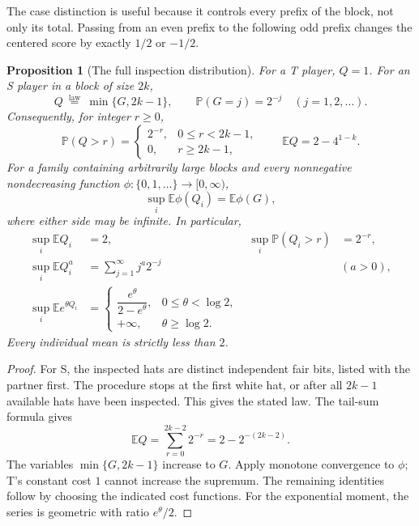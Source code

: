 \documentclass[11pt,letterpaper]{article}
\newtheorem{proposition}[theorem]{Proposition}
\theoremstyle{definition}
\newcommand{\E}{\mathbb E}
\newcommand{\Prb}{\mathbb P}
\begin{document}
The case distinction is useful because it controls every prefix of the
block, not only its total.  Passing from an even prefix to the following odd
prefix changes the centered score by exactly $1/2$ or $-1/2$.

\begin{proposition}[The full inspection distribution]
\label{mbg:insp:con-query-distribution}
For a T player, $Q=1$.  For an S player in a block of size $2k$,
\[
 Q\ \stackrel{\mathrm{law}}{=}\ \min\{G,2k-1\},
 \qquad \Prb(G=j)=2^{-j}\quad(j=1,2,\ldots).
\]
Consequently, for integer $r\geq0$,
\[
 \Prb(Q>r)=
 \begin{cases}
 2^{-r},&0\leq r<2k-1,\\
 0,&r\geq2k-1,
 \end{cases}
 \qquad
 \E Q=2-4^{1-k}.
\]
For a family containing arbitrarily large blocks and every nonnegative
nondecreasing function $\phi:\{0,1,\ldots\}\to[0,\infty)$,
\begin{equation}\label{mbg:insp:con-cost-envelope}
 \sup_i\E\phi(Q_i)=\E\phi(G),
\end{equation}
where either side may be infinite.  In particular,
\begin{align}
 \sup_i\E Q_i&=2, &
 \sup_i\Prb(Q_i>r)&=2^{-r},\label{mbg:insp:con-mean-tail}\\
 \sup_i\E Q_i^a&=\sum_{j=1}^{\infty}j^a2^{-j}
       &&(a>0),\label{mbg:insp:con-moments}\\
 \sup_i\E e^{\theta Q_i}&=
 \begin{cases}
 \dfrac{e^\theta}{2-e^\theta},&0\leq\theta<\log2,\\[4pt]
 +\infty,&\theta\geq\log2.
 \end{cases}\label{mbg:insp:con-mgf}
\end{align}
Every individual mean is strictly less than $2$.
\end{proposition}

\begin{proof}
For S, the inspected hats are distinct independent fair bits, listed with
the partner first.  The procedure stops at the first white hat, or after
all $2k-1$ available hats have been inspected.  This gives the stated law.
The tail-sum formula gives
\[
 \E Q=\sum_{r=0}^{2k-2}2^{-r}=2-2^{-(2k-2)}.
\]
The variables $\min\{G,2k-1\}$ increase to $G$.  Apply monotone convergence
to $\phi$; T's constant cost $1$ cannot increase the supremum.  The remaining
identities follow by choosing the indicated cost functions.  For the
exponential moment, the series is geometric with ratio $e^\theta/2$.
\end{proof}
\end{document}
